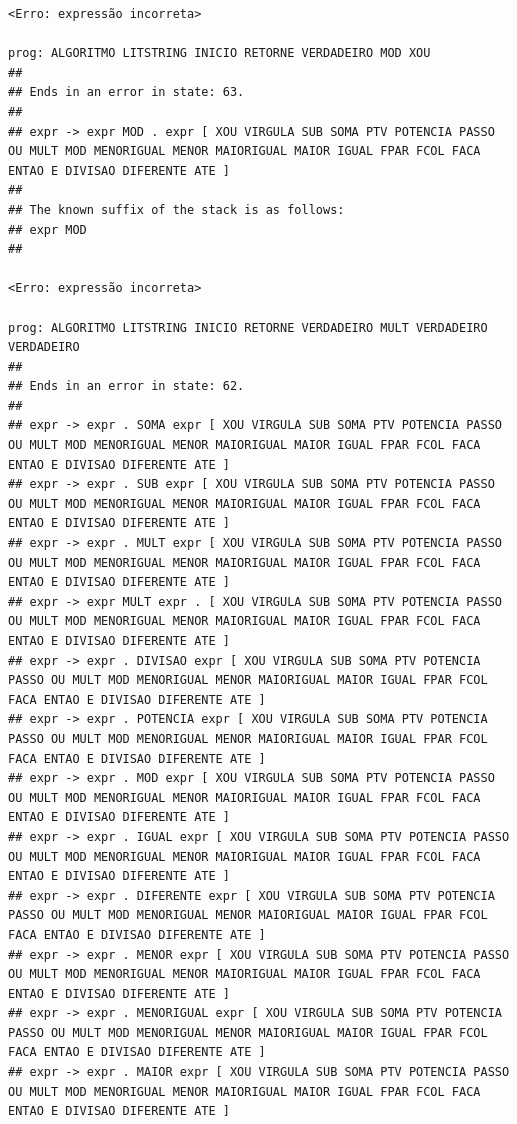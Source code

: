 \documentclass[hidelinks,12pt]{article}
\begin{document}
\begin{lstlisting}
<Erro: expressão incorreta>

prog: ALGORITMO LITSTRING INICIO RETORNE VERDADEIRO MOD XOU 
##
## Ends in an error in state: 63.
##
## expr -> expr MOD . expr [ XOU VIRGULA SUB SOMA PTV POTENCIA PASSO OU MULT MOD MENORIGUAL MENOR MAIORIGUAL MAIOR IGUAL FPAR FCOL FACA ENTAO E DIVISAO DIFERENTE ATE ]
##
## The known suffix of the stack is as follows:
## expr MOD 
##

<Erro: expressão incorreta>

prog: ALGORITMO LITSTRING INICIO RETORNE VERDADEIRO MULT VERDADEIRO VERDADEIRO 
##
## Ends in an error in state: 62.
##
## expr -> expr . SOMA expr [ XOU VIRGULA SUB SOMA PTV POTENCIA PASSO OU MULT MOD MENORIGUAL MENOR MAIORIGUAL MAIOR IGUAL FPAR FCOL FACA ENTAO E DIVISAO DIFERENTE ATE ]
## expr -> expr . SUB expr [ XOU VIRGULA SUB SOMA PTV POTENCIA PASSO OU MULT MOD MENORIGUAL MENOR MAIORIGUAL MAIOR IGUAL FPAR FCOL FACA ENTAO E DIVISAO DIFERENTE ATE ]
## expr -> expr . MULT expr [ XOU VIRGULA SUB SOMA PTV POTENCIA PASSO OU MULT MOD MENORIGUAL MENOR MAIORIGUAL MAIOR IGUAL FPAR FCOL FACA ENTAO E DIVISAO DIFERENTE ATE ]
## expr -> expr MULT expr . [ XOU VIRGULA SUB SOMA PTV POTENCIA PASSO OU MULT MOD MENORIGUAL MENOR MAIORIGUAL MAIOR IGUAL FPAR FCOL FACA ENTAO E DIVISAO DIFERENTE ATE ]
## expr -> expr . DIVISAO expr [ XOU VIRGULA SUB SOMA PTV POTENCIA PASSO OU MULT MOD MENORIGUAL MENOR MAIORIGUAL MAIOR IGUAL FPAR FCOL FACA ENTAO E DIVISAO DIFERENTE ATE ]
## expr -> expr . POTENCIA expr [ XOU VIRGULA SUB SOMA PTV POTENCIA PASSO OU MULT MOD MENORIGUAL MENOR MAIORIGUAL MAIOR IGUAL FPAR FCOL FACA ENTAO E DIVISAO DIFERENTE ATE ]
## expr -> expr . MOD expr [ XOU VIRGULA SUB SOMA PTV POTENCIA PASSO OU MULT MOD MENORIGUAL MENOR MAIORIGUAL MAIOR IGUAL FPAR FCOL FACA ENTAO E DIVISAO DIFERENTE ATE ]
## expr -> expr . IGUAL expr [ XOU VIRGULA SUB SOMA PTV POTENCIA PASSO OU MULT MOD MENORIGUAL MENOR MAIORIGUAL MAIOR IGUAL FPAR FCOL FACA ENTAO E DIVISAO DIFERENTE ATE ]
## expr -> expr . DIFERENTE expr [ XOU VIRGULA SUB SOMA PTV POTENCIA PASSO OU MULT MOD MENORIGUAL MENOR MAIORIGUAL MAIOR IGUAL FPAR FCOL FACA ENTAO E DIVISAO DIFERENTE ATE ]
## expr -> expr . MENOR expr [ XOU VIRGULA SUB SOMA PTV POTENCIA PASSO OU MULT MOD MENORIGUAL MENOR MAIORIGUAL MAIOR IGUAL FPAR FCOL FACA ENTAO E DIVISAO DIFERENTE ATE ]
## expr -> expr . MENORIGUAL expr [ XOU VIRGULA SUB SOMA PTV POTENCIA PASSO OU MULT MOD MENORIGUAL MENOR MAIORIGUAL MAIOR IGUAL FPAR FCOL FACA ENTAO E DIVISAO DIFERENTE ATE ]
## expr -> expr . MAIOR expr [ XOU VIRGULA SUB SOMA PTV POTENCIA PASSO OU MULT MOD MENORIGUAL MENOR MAIORIGUAL MAIOR IGUAL FPAR FCOL FACA ENTAO E DIVISAO DIFERENTE ATE ]

\end{lstlisting}
\end{document}

